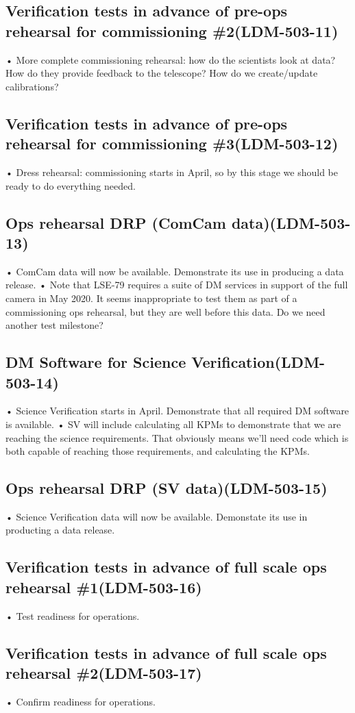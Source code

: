 \subsection{Verification tests in advance of pre-ops rehearsal for commissioning \#2\textbf{(LDM-503-11)}\label{LDM-503-11}}
• More complete commissioning rehearsal: how do the scientists look at data? How do they provide feedback to the telescope? How do we create/update calibrations?
 \newline
\subsection{Verification tests in advance of pre-ops rehearsal for commissioning \#3\textbf{(LDM-503-12)}\label{LDM-503-12}}
• Dress rehearsal: commissioning starts in April, so by this stage we should be ready to do everything needed.
 \newline
\subsection{ Ops rehearsal DRP (ComCam data)\textbf{(LDM-503-13)}\label{LDM-503-13}}
• ComCam data will now be available. Demonstrate its use in producing a data release.
 \newline• Note that LSE-79 requires a suite of DM services in support of the full camera in May 2020. It seems inappropriate to test them as part of a commissioning ops rehearsal, but they are well before this data. Do we need another test milestone?
\subsection{ DM Software for Science Verification\textbf{(LDM-503-14)}\label{LDM-503-14}}
• Science Verification starts in April. Demonstrate that all required DM software is available.
 \newline• SV will include calculating all KPMs to demonstrate that we are reaching the science requirements. That obviously means we'll need code which is both capable of reaching those requirements, and calculating the KPMs. 
\subsection{ Ops rehearsal DRP (SV data)\textbf{(LDM-503-15)}\label{LDM-503-15}}
• Science Verification data will now be available. Demonstate its use in producting a data release.
 \newline
\subsection{Verification tests in advance of full scale ops rehearsal \#1\textbf{(LDM-503-16)}\label{LDM-503-16}}
• Test readiness for operations.
 \newline
\subsection{Verification tests in advance of full scale ops rehearsal \#2\textbf{(LDM-503-17)}\label{LDM-503-17}}
• Confirm readiness for operations.
 \newline
